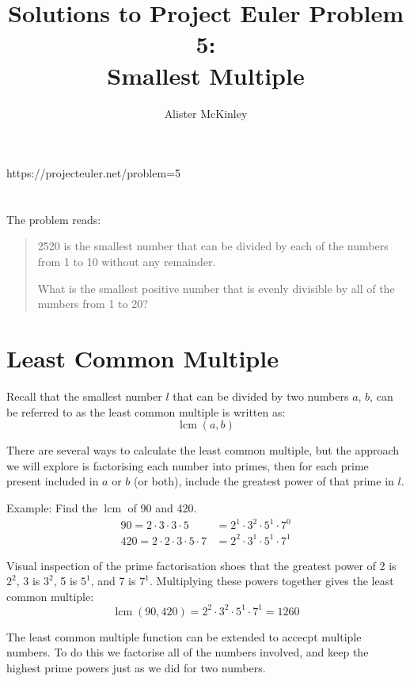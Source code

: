 \documentclass{article}
\title{Solutions to Project Euler Problem 5:\\Smallest Multiple}
\author{Alister McKinley}
\date{}
\DeclareMathOperator{\lcm}{lcm}
\begin{document}
\maketitle
\begin{center}
    https://projecteuler.net/problem=5
\end{center}

\section*{}
The problem reads:

\begin{quote}
    2520 is the smallest number that can be divided by each of the numbers from 1 to 10 without any remainder.

    What is the smallest positive number that is evenly divisible by all of the numbers from 1 to 20?
\end{quote}

\section*{Least Common Multiple}
Recall that the smallest number \(l\) that can be divided by two numbers \(a\), \(b\), can be referred to as the least common multiple is written as:
\[ \lcm(a,b)\]

There are several ways to calculate the least common multiple, but the approach we will explore is factorising each number into primes, then for each prime present included in \(a\) or \(b\) (or both), include the greatest power of that prime in \(l\).

Example: Find the \(\lcm\) of 90 and 420.
\[\begin{aligned}
    90 = 2 \cdot 3 \cdot 3 \cdot 5 &= 2^1 \cdot 3^2 \cdot 5^1 \cdot 7^0 \\
    420 = 2 \cdot 2 \cdot 3 \cdot 5 \cdot 7 &= 2^2 \cdot 3^1 \cdot 5^1 \cdot 7^1
\end{aligned}\]

Visual inspection of the prime factorisation shoes that the greatest power of 2 is \(2^2\), 3 is \(3^2\), 5 is \(5^1\), and 7 is \(7^1\). Multiplying these powers together gives the least common multiple:
\[ \lcm(90, 420) = 2^2 \cdot 3^2 \cdot 5^1 \cdot 7^1 = 1260\]

The least common multiple function can be extended to accecpt multiple numbers. To do this we factorise all of the numbers involved, and keep the highest prime powers just as we did for two numbers.
\end{document}
